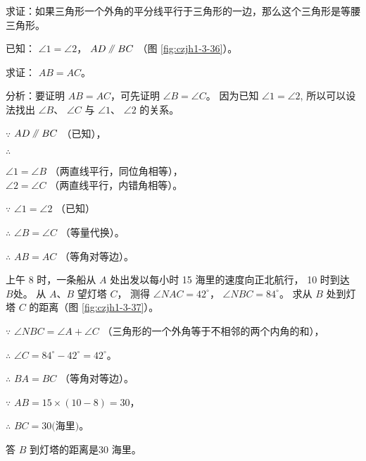 \liti 求证：如果三角形一个外角的平分线平行于三角形的一边，那么这个三角形是等腰三角形。

已知： $\angle 1 = \angle 2$， $AD \pingxing BC$ （图 \ref{fig:czjh1-3-36}）。

求证： $AB = AC$。

分析：要证明 $AB = AC$，可先证明 $\angle B = \angle C$。 因为已知 $\angle 1 = \angle 2$,
所以可以设法找出 $\angle B$、 $\angle C$ 与 $\angle 1$、 $\angle 2$ 的关系。

\zhengming $\because$ \quad $AD \pingxing BC$ （已知），

$\therefore$ \quad \begin{zmtblr}[t]{}
    $\angle 1 = \angle B$ （两直线平行，同位角相等）， \\
    $\angle 2 = \angle C$ （两直线平行，内错角相等）。 \\
\end{zmtblr}

$\because$ \quad $\angle 1 = \angle 2$ （已知）

$\therefore$ \quad $\angle B = \angle C$ （等量代换）。

$\therefore$ \quad $AB = AC$ （等角对等边）。



%     

\liti 上午 8 时，一条船从 $A$ 处出发以每小时 15 海里的速度向正北航行， 10 时到达 $B$处。
从 $A$、$B$ 望灯塔 $C$， 测得 $\angle NAC = 42^\circ$， $\angle NBC = 84^\circ$。
求从 $B$ 处到灯塔 $C$ 的距离（图 \ref{fig:czjh1-3-37}）。

\jie $\because$ \quad $\angle NBC = \angle A + \angle C$ （三角形的一个外角等于不相邻的两个内角的和），

$\therefore$ \quad $\angle C = 84^\circ - 42^\circ = 42^\circ$。

$\therefore$ \quad  $BA = BC$ （等角对等边）。

$\because$ \quad $AB = 15 \times (10 - 8) = 30$，

$\therefore$ \quad $BC = 30 \text{(海里)}$。

答 \quad $B$ 到灯塔的距离是30 海里。


\begin{figure}[htbp]
    \centering
    \begin{minipage}[b]{7cm}
        \centering
        
        \caption{}\label{fig:czjh1-3-37}
    \end{minipage}
    \qquad
    \begin{minipage}[b]{7cm}
        \centering
        
        \caption{}\label{fig:czjh1-3-38}
    \end{minipage}
\end{figure}

